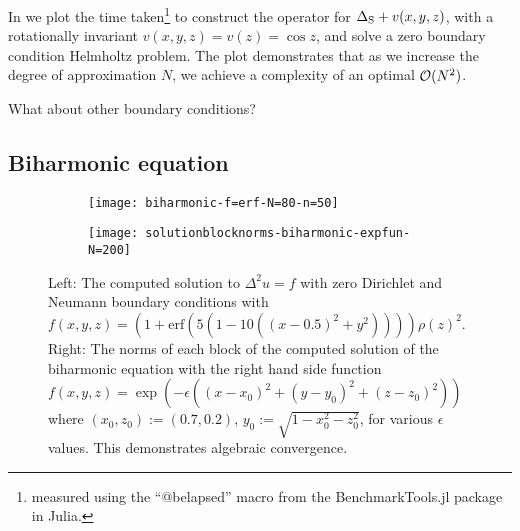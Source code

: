 In  we plot the time taken\footnote{measured using the \enquote{@belapsed} macro from the BenchmarkTools.jl package \cite{BenchmarkTools.jl-2016} in Julia.} to construct the operator for $\Delta_{\rm S} + v(x,y,z)$, with a rotationally invariant $v(x,y,z) = v(z) = \cos z$, and solve a zero boundary condition Helmholtz problem. The plot demonstrates that as we increase the degree of approximation $N$, we achieve a complexity of an optimal $\mathcal{O}(N^2)$.

What about other boundary conditions? 

\subsection{Biharmonic equation}

\begin{figure}[tp]
	\centering
	\begin{subfigure}{0.85\textwidth}
		\texttt{[image: biharmonic-f=erf-N=80-n=50]}
	\end{subfigure}
	\hfill%
	
	\begin{subfigure}{0.55\textwidth}
		\texttt{[image: solutionblocknorms-biharmonic-expfun-N=200]}
	\end{subfigure}
	\hfill%
	\caption{Left: The computed solution to $\Delta^2 u = f$ with zero Dirichlet and Neumann boundary conditions with $f(x,y,z) = (1 + \text{erf}(5(1 - 10((x - 0.5)^2 + y^2)))) \rho(z)^2$. Right: The norms of each block of the computed solution of the biharmonic equation with the right hand side function $f(x,y,z) = \exp(-\epsilon((x-x_0)^2 + (y-y_0)^2 + (z-z_0)^2))$ where  $(x_0, z_0) := (0.7, 0.2)$, $y_0 := \sqrt{1 - x_0^2 - z_0^2}$, for various $\epsilon$ values. This demonstrates algebraic convergence.}
	\label{fig:sc:biharmonic}
\end{figure}

